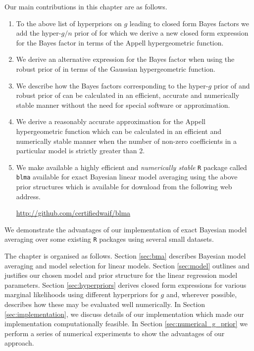 Our main contributions in this chapter are as follows.
\begin{enumerate}

    \item To the above list of hyperpriors on $g$ leading to closed form Bayes
        factors we add the  hyper-$g/n$ prior of \cite{Liang2008} for which we
        derive a new closed form expression for the Bayes factor in terms of
        the Appell hypergeometric function.
	
    \item We derive an alternative expression for the Bayes factor when using
        the robust prior of \cite{Bayarri2012} in terms of the Gaussian
        hypergeometric function.
	
    \item We describe how the  Bayes factors corresponding to the hyper-$g$
        prior of \cite{Liang2008} and robust prior of \cite{Bayarri2012} can be
        calculated in an efficient, accurate and numerically stable manner
        without the need for special software or approximation.
	
    \item We derive a reasonably accurate approximation for the Appell
        hypergeometric function which can be calculated in an efficient and
        numerically stable manner when the number of non-zero coefficients in a
        particular model is strictly greater than 2.
	
    \item We make available a highly efficient and {\it numerically stable}
        {\tt R} package called {\tt blma} available for exact Bayesian linear
        model averaging using the above prior structures which is available for
        download from the following web address.
	
	\begin{center}
		\url{http://github.com/certifiedwaif/blma}
	\end{center}

\end{enumerate}

\noindent We demonstrate the advantages of our implementation of exact Bayesian
model averaging over some existing {\tt R} packages using several small
datasets.


The chapter is organised as follows. Section \ref{sec:bma} describes Bayesian
model averaging and model selection for linear models. Section \ref{sec:model}
outlines and justifies our chosen model and prior structure for the linear
regression model parameters. Section \ref{sec:hyperpriors} derives closed form
expressions for various marginal likelihoods using different hyperpriors for
$g$ and, wherever possible, describes how these may be evaluated well
numerically.  In Section \ref{sec:implementation}, we discuss details of our
implementation which made our implementation computationally feasible.  In
Section \ref{sec:numerical_g_prior} we perform a series of numerical
experiments to show the advantages of our approach. 

